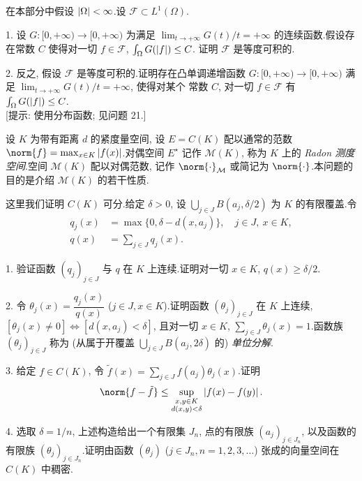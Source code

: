 \begin{problem}[第 3, 4 章]

在本部分中假设 $\left|\Omega\right|<\infty$.设 $\mathcal{F}\subset L^1(\Omega)$.

1. 设 $G:[0,+\infty)\to[0,+\infty)$ 为满足 $\lim_{t\to+\infty}G(t)/t=+\infty$
的连续函数.假设存在常数 $C$ 使得对一切 $f\in\mathcal{F}$, $\int_\Omega G(\left|f\right|)\le C$.
证明 $\mathcal{F}$ 是等度可积的.

2. 反之, 假设 $\mathcal{F}$ 是等度可积的.证明存在凸单调递增函数
$G:[0,+\infty)\to[0,+\infty)$ 满足 $\lim_{t\to+\infty}G(t)/t=+\infty$, 使得对某个
常数 $C$, 对一切 $f\in\mathcal{F}$ 有 $\int_\Omega G(\left|f\right|)\le C$.\\
{[提示: 使用分布函数; 见问题 21.]}
\end{problem}

\begin{problem}[第 1, 3, 4 章]
\label{prob:24}
设 $K$ 为带有距离 $d$ 的紧度量空间, 设 $E=C(K)$ 配以通常的范数
$\norm{f}=\max_{x\in K}\abs{f(x)}$.对偶空间 $E^\star$ 记作 $\mathcal{M}(K)$,
称为 $K$ 上的 \emph{Radon 测度空间}.空间 $\mathcal{M}(K)$ 配以对偶范数, 记作
$\norm{\cdot}_{\mathcal{M}}$ 或简记为 $\norm{\cdot}$.本问题的目的是介绍
$\mathcal{M}(K)$ 的若干性质.


这里我们证明 $C(K)$ 可分.给定 $\delta>0$, 设 $\bigcup_{j\in J}B(a_j,\delta/2)$ 为
$K$ 的有限覆盖.令
\begin{align*}
q_j(x)&=\max\{0,\delta-d(x,a_j)\},\quad j\in J,\ x\in K,\\
q(x)&=\sum_{j\in J}q_j(x).
\end{align*}

1. 验证函数 $(q_j)_{j\in J}$ 与 $q$ 在 $K$ 上连续.证明对一切 $x\in K$,
$q(x)\ge\delta/2$.

2. 令 $\theta_j(x)=\dfrac{q_j(x)}{q(x)}$ ($j\in J,x\in K$).证明函数
$(\theta_j)_{j\in J}$ 在 $K$ 上连续, $[\theta_j(x)\ne0]\iff[d(x,a_j)<\delta]$,
且对一切 $x\in K$, $\sum_{j\in J}\theta_j(x)=1$.函数族 $(\theta_j)_{j\in J}$
称为 (从属于开覆盖 $\bigcup_{j\in J}B(a_j,2\delta)$ 的) \emph{单位分解}.

3. 给定 $f\in C(K)$, 令 $\tilde f(x)=\sum_{j\in J}f(a_j)\theta_j(x)$.证明
\begin{equation*}
\norm{f-\tilde f}\le\sup_{\substack{x,y\in K\\d(x,y)<\delta}}\abs{f(x)-f(y)}.
\end{equation*}

4. 选取 $\delta=1/n$, 上述构造给出一个有限集 $J_n$, 点的有限族 $(a_j)_{j\in J_n}$,
以及函数的有限族 $(\theta_j)_{j\in J_n}$.证明由函数 $(\theta_j)$ ($j\in J_n,n=1,2,3,\dots$)
张成的向量空间在 $C(K)$ 中稠密.


\end{problem}
